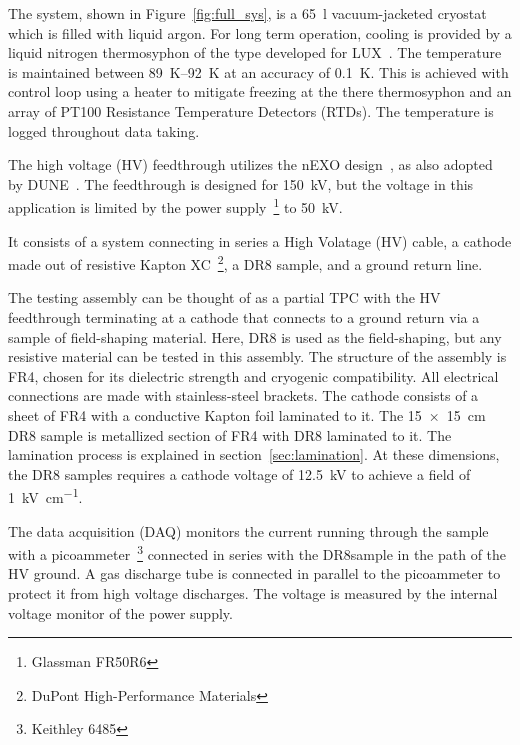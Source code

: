 \documentclass[a4paper,12pt]{article}
\newcommand{\DR}{DR8}
\begin{document}
The system, shown in Figure~\ref{fig:full_sys}, is a \SI{65}{\litre} vacuum-jacketed cryostat which is filled with liquid argon. 
For long term operation, cooling is provided by a liquid nitrogen thermosyphon of the type developed for LUX~\cite{lux}.
The temperature is maintained between \SIrange{89}{92}{\kelvin} at an accuracy of \SI{0.1}{\kelvin}. 
This is achieved with control loop using a heater to mitigate freezing at the there thermosyphon and an array of PT100 Resistance Temperature Detectors (RTDs).
The temperature is logged throughout data taking.   

The high voltage (HV) feedthrough utilizes the nEXO design~\cite{nEXO_pcdr}, as also adopted by DUNE~\cite{DUNE:2021tad}. 
The feedthrough is designed for \SI{150}{\kilo\volt}, but the voltage in this application is limited by the power supply~\footnote{Glassman FR50R6} to \SI{50}{\kilo\volt}. 



It consists of a system connecting in series a High Volatage (HV) cable, a cathode made out of resistive Kapton XC~\footnote{DuPont High-Performance Materials}, a {\DR} sample, and a ground return line. 


The testing assembly can be thought of as a partial TPC with the HV feedthrough terminating at a cathode that connects to a ground return via a sample of field-shaping material. 
Here, {\DR} is used as the field-shaping, but any resistive material can be tested in this assembly.    
The structure of the assembly is FR4, chosen for its dielectric strength and cryogenic compatibility.
All electrical connections are made with stainless-steel brackets. 
The cathode consists of a sheet of FR4 with a conductive Kapton foil laminated to it.   
The \SI{15x15}{\centi\metre} {\DR} sample is metallized section of FR4 with {\DR} laminated to it.   
The lamination process is explained in section~\ref{sec:lamination}.
At these dimensions, the {\DR} samples requires a cathode voltage of \SI{12.5}{\kilo\volt} to achieve a field of \SI{1}{\kilo\volt\per\centi\metre}.    

The data acquisition (DAQ) monitors the current running through the sample with a picoammeter~\footnote{Keithley 6485} connected in series with the \DR sample in the path of the HV ground. 
A gas discharge tube is connected in parallel to the picoammeter to protect it from high voltage discharges. 
The voltage is measured by the internal voltage monitor of the power supply.
\end{document}
